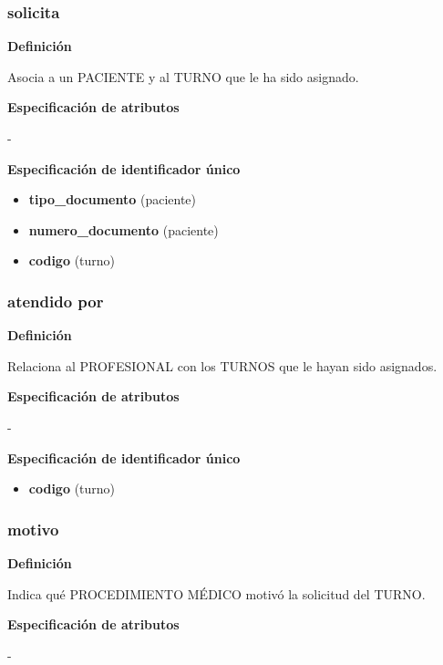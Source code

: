 \documentclass[a4paper,11pt]{article}
\begin{document}
\subsubsection{\textbf{solicita}}

\textbf{Definición}

Asocia a un PACIENTE y al TURNO que le ha sido asignado.

\textbf{Especificación de atributos}

-

\textbf{Especificación de identificador único}

\begin{itemize}

     \item \textbf{tipo\_documento} (paciente)

     \item \textbf{numero\_documento} (paciente)

     \item \textbf{codigo} (turno)

\end{itemize}

\subsubsection{\textbf{atendido por}}

\textbf{Definición}

Relaciona al PROFESIONAL con los TURNOS que le hayan sido asignados.

\textbf{Especificación de atributos}

-

\textbf{Especificación de identificador único}

\begin{itemize}

     \item \textbf{codigo} (turno)

\end{itemize}

\subsubsection{\textbf{motivo}}

\textbf{Definición}

Indica qué PROCEDIMIENTO MÉDICO motivó la solicitud del TURNO.

\textbf{Especificación de atributos}

-
\end{document}
